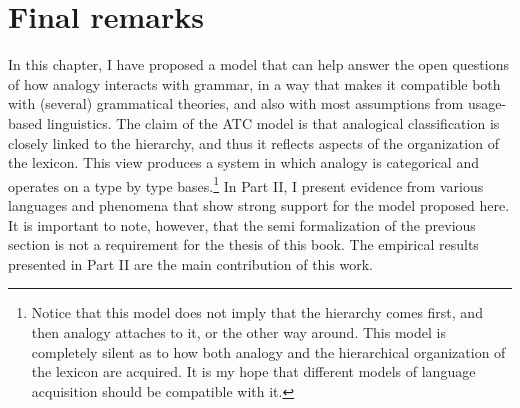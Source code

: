 
\section{Final remarks}

In this chapter, I have proposed a model that can help answer the open questions of how analogy interacts with grammar, in a way that makes it compatible both with (several) grammatical theories, and also with most assumptions from usage-based linguistics.
The claim of the ATC model is that analogical classification is closely linked to the hierarchy, and thus it reflects aspects of the organization of the lexicon. This view produces a system in which analogy is categorical and operates on a type by type bases.\footnote{Notice that this model does not imply that the hierarchy comes first, and then analogy attaches to it, or the other way around. This model is completely silent as to how both analogy and the hierarchical organization of the lexicon are acquired. It is my hope that different models of language acquisition should be compatible with it.}
In Part II, I present evidence from various languages and phenomena that show strong support for the model proposed here.
It is important to note, however, that the semi formalization of the previous section is not a requirement for the thesis of this book. The empirical results presented in Part II are the main contribution of this work. %


